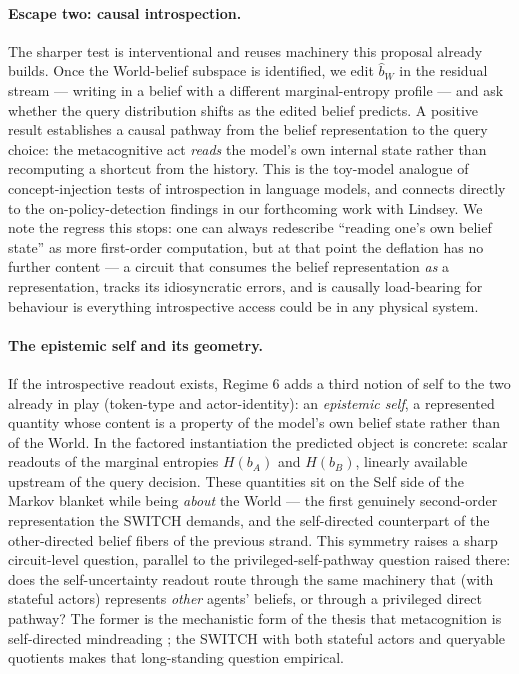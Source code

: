 \paragraph{Escape two: causal introspection.} The sharper test is
interventional and reuses machinery this proposal already builds. Once the
World-belief subspace is identified, we edit $\hat b_W$ in the residual stream
--- writing in a belief with a different marginal-entropy profile --- and ask
whether the query distribution shifts as the edited belief predicts. A positive
result establishes a causal pathway from the belief representation to the query
choice: the metacognitive act \emph{reads} the model's own internal state
rather than recomputing a shortcut from the history. This is the toy-model
analogue of concept-injection tests of introspection in language models, and
connects directly to the on-policy-detection findings in our forthcoming work
with Lindsey. We note the regress this stops: one can always redescribe
``reading one's own belief state'' as more first-order computation, but at that
point the deflation has no further content --- a circuit that consumes the
belief representation \emph{as} a representation, tracks its idiosyncratic
errors, and is causally load-bearing for behaviour is everything introspective
access could be in any physical system.

\paragraph{The epistemic self and its geometry.} If the introspective readout
exists, Regime 6 adds a third notion of self to the two already in play
(token-type and actor-identity): an \emph{epistemic self}, a represented
quantity whose content is a property of the model's own belief state rather
than of the World. In the factored instantiation the predicted object is
concrete: scalar readouts of the marginal entropies $H(b_A)$ and $H(b_B)$,
linearly available upstream of the query decision. These quantities sit on the
Self side of the Markov blanket while being \emph{about} the World --- the
first genuinely second-order representation the SWITCH demands, and the
self-directed counterpart of the other-directed belief fibers of the previous
strand. This symmetry raises a sharp circuit-level question, parallel to the
privileged-self-pathway question raised there: does the self-uncertainty
readout route through the same machinery that (with stateful actors) represents
\emph{other} agents' beliefs, or through a privileged direct pathway? The
former is the mechanistic form of the thesis that metacognition is self-directed
mindreading \citep{carruthers2009mindreading}; the SWITCH with both stateful
actors and queryable quotients makes that long-standing question empirical.

